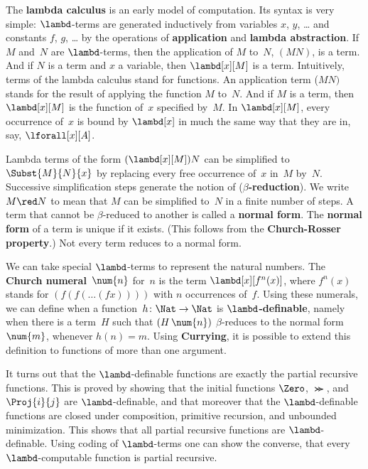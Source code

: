 The \textbf{lambda calculus} is an early model of computation. Its
syntax is very simple: $\lambd$-terms are generated inductively from
variables $x$, $y$, \dots{} and constants $f$, $g$, \dots{} by the
operations of \textbf{application} and \textbf{lambda abstraction}. If
$M$ and~$N$ are $\lambd$-terms, then the application of $M$ to~$N$,
$(MN)$, is a term. And if $N$ is a term and $x$ a variable, then
$\lambd[x][M]$ is a term. Intuitively, terms of the lambda calculus
stand for functions. An application term ($MN)$ stands for the result
of applying the function $M$ to~$N$. And if $M$ is a term, then
$\lambd[x][M]$ is the function of~$x$ specified by~$M$. In
$\lambd[x][M]$, every occurrence of~$x$ is bound by $\lambd[x]$ in
much the same way that they are in, say, $\lforall[x][A]$.

Lambda terms of the form $(\lambd[x][M])N$ can be simplified to
$\Subst{M}{N}{x}$ by replacing every free occurrence of~$x$ in~$M$
by~$N$. Successive simplification steps generate the notion of
(\textbf{$\beta$-reduction}). We write $M \red N$ to mean that $M$
can be simplified to~$N$ in a finite number of steps. A term that
cannot be $\beta$-reduced to another is called a \textbf{normal form}.
The \textbf{normal form} of a term is unique if it exists. (This
follows from the \textbf{Church-Rosser property}.) Not every term
reduces to a normal form.

We can take special $\lambd$-terms to represent the natural numbers.
The \textbf{Church numeral}~$\num{n}$ for~$n$ is the term
$\lambd[x][f^n(x)]$, where $f^n(x)$ stands for $(f(f(\dots(f x))))$ with
$n$ occurrences of~$f$. Using these numerals, we can define when a
function~$h\colon \Nat \to \Nat$ is \textbf{$\lambd$-definable},
namely when there is a term~$H$ such that $(H\, \num{n})$
$\beta$-reduces to the normal form~$\num{m}$, whenever $h(n) = m$.
Using \textbf{Currying}, it is possible to extend this definition to
functions of more than one argument.

It turns out that the $\lambd$-definable functions are exactly the
partial recursive functions. This is proved by showing that the
initial functions $\Zero$, $\Succ$, and~$\Proj{i}{j}$ are
$\lambd$-definable, and that moreover that the $\lambd$-definable
functions are closed under composition, primitive recursion, and
unbounded minimization. This shows that all partial recursive functions
are $\lambd$-definable. Using coding of $\lambd$-terms one can show
the converse, that every $\lambd$-computable function is partial recursive.